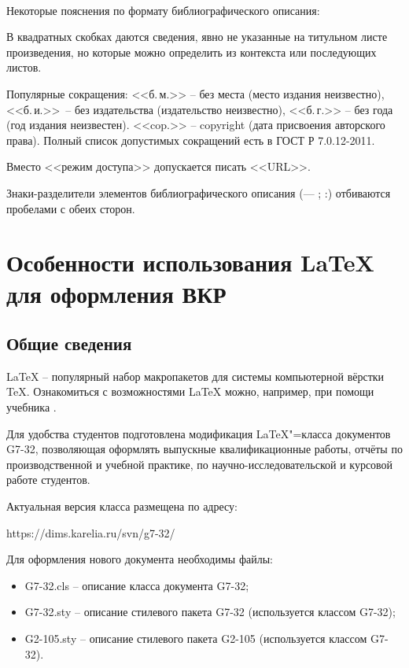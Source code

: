 \documentclass[utf8,14pt, coursreport]{G7-32}
\begin{document}
~

Некоторые пояснения по формату библиографического описания:

В квадратных скобках даются сведения, явно не указанные на титульном листе произведения, но которые можно определить из контекста или последующих листов. 

Популярные сокращения: <<б.\,м.>> -- без места (место издания неизвестно), <<б.\,и.>>~-- без издательства (издательство неизвестно), <<б.\,г.>> -- без года (год издания неизвестен). <<cop.>> -- copyright (дата присвоения авторского права). Полный список допустимых сокращений есть в ГОСТ Р 7.0.12-2011.

Вместо <<режим доступа>> допускается писать <<URL>>.

Знаки-разделители элементов библиографического описания (--- ; :) отбиваются пробелами  с обеих сторон.

\chapter{Особенности использования \LaTeX{} для оформления ВКР}

\section{Общие сведения}

\LaTeX{} -- популярный набор макропакетов для системы компьютерной вёрстки \TeX. Ознакомиться с возможностями \LaTeX{} можно, например, при помощи учебника \cite{latex}.

Для удобства студентов подготовлена модификация \LaTeX{}"=класса документов G7-32, позволяющая оформлять выпускные квалификационные работы, отчёты по производственной и учебной практике, по научно-исследовательской и курсовой работе студентов.

Актуальная версия класса размещена по адресу:

https://dims.karelia.ru/svn/g7-32/

Для оформления нового документа необходимы файлы:
\begin{itemize}
\item G7-32.cls -- описание класса документа G7-32;
\item G7-32.sty -- описание стилевого пакета G7-32 (используется классом G7-32);
\item G2-105.sty -- описание стилевого пакета G2-105 (используется классом G7-32).
\end{itemize}
\end{document}
